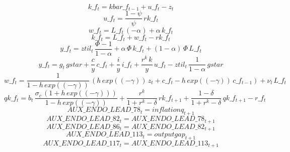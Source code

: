 \documentclass[10pt,a4paper]{article}
\begin{document}
\begin{dmath}
k\_f_{t}=kbar\_f_{t-1}+u\_f_{t}-z_{t}
\end{dmath}
\begin{dmath}
u\_f_{t}=\frac{1-\psi}{\psi}\, rk\_f_{t}
\end{dmath}
\begin{dmath}
w\_f_{t}=L\_f_{t}\, \left(-\alpha\right)+\alpha\, k\_f_{t}
\end{dmath}
\begin{dmath}
k\_f_{t}=L\_f_{t}+w\_f_{t}-rk\_f_{t}
\end{dmath}
\begin{dmath}
y\_f_{t}=ztil_{t}\, \frac{\Phi-1}{1-\alpha}+\alpha\, \Phi\, k\_f_{t}+\left(1-\alpha\right)\, \Phi\, L\_f_{t}
\end{dmath}
\begin{dmath}
y\_f_{t}=g_{t}\, gstar+\frac{c}{y}\, c\_f_{t}+\frac{i}{y}\, i\_f_{t}+\frac{r^k\, k}{y}\, u\_f_{t}-ztil_{t}\, \frac{1}{1-\alpha}\, gstar
\end{dmath}
\begin{dmath}
w\_f_{t}=\frac{1}{1-h\, exp\left(\left(-\gamma\right)\right)}\, \left(h\, exp\left(\left(-\gamma\right)\right)\, z_{t}+c\_f_{t}-h\, exp\left(\left(-\gamma\right)\right)\, c\_f_{t-1}\right)+\nu_l\, L\_f_{t}
\end{dmath}
\begin{dmath}
qk\_f_{t}=b_{t}\, \frac{\sigma_c\, \left(1+h\, exp\left(\left(-\gamma\right)\right)\right)}{1-h\, exp\left(\left(-\gamma\right)\right)}+\frac{r^k}{1+r^k-\delta}\, rk\_f_{t+1}+\frac{1-\delta}{1+r^k-\delta}\, qk\_f_{t+1}-r\_f_{t}
\end{dmath}
\begin{dmath}
AUX\_ENDO\_LEAD\_78_{t}=inflationq_{t+1}
\end{dmath}
\begin{dmath}
AUX\_ENDO\_LEAD\_82_{t}=AUX\_ENDO\_LEAD\_78_{t+1}
\end{dmath}
\begin{dmath}
AUX\_ENDO\_LEAD\_86_{t}=AUX\_ENDO\_LEAD\_82_{t+1}
\end{dmath}
\begin{dmath}
AUX\_ENDO\_LEAD\_113_{t}=outputgap_{t+1}
\end{dmath}
\begin{dmath}
AUX\_ENDO\_LEAD\_117_{t}=AUX\_ENDO\_LEAD\_113_{t+1}
\end{dmath}
\end{document}
